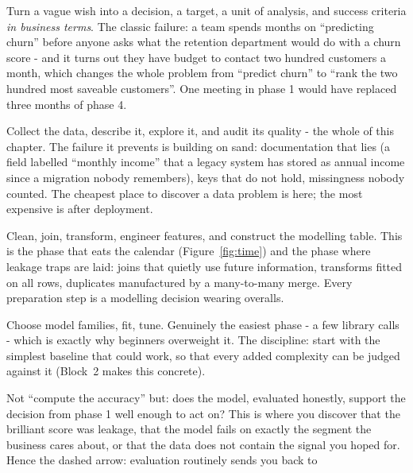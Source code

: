 \documentclass[11pt,a4paper]{article}
\begin{document}
\begin{description}[leftmargin=1.4em,style=nextline,itemsep=3pt]
  \item[1. Business understanding.] Turn a vague wish into a decision, a
        target, a unit of analysis, and success criteria \emph{in business
        terms}. The classic failure: a team spends months on ``predicting
        churn'' before anyone asks what the retention department would do
        with a churn score - and it turns out they have budget to contact
        two hundred customers a month, which changes the whole problem from
        ``predict churn'' to ``rank the two hundred most saveable
        customers''. One meeting in phase 1 would have replaced three
        months of phase 4.
  \item[2. Data understanding.] Collect the data, describe it, explore it,
        and audit its quality - the whole of this chapter. The failure it
        prevents is building on sand: documentation that lies (a field
        labelled ``monthly income'' that a legacy system has stored as
        annual income since a migration nobody remembers), keys that do not
        hold, missingness nobody counted. The cheapest place to discover a
        data problem is here; the most expensive is after deployment.
  \item[3. Data preparation.] Clean, join, transform, engineer features,
        and construct the modelling table. This is the phase that eats the
        calendar (Figure~\ref{fig:time}) and the phase where leakage traps
        are laid: joins that quietly use future information, transforms
        fitted on all rows, duplicates manufactured by a many-to-many merge.
        Every preparation step is a modelling decision wearing overalls.
  \item[4. Modelling.] Choose model families, fit, tune. Genuinely the
        easiest phase - a few library calls - which is exactly why
        beginners overweight it. The discipline: start with the simplest
        baseline that could work, so that every added complexity can be
        judged against it (Block~2 makes this concrete).
  \item[5. Evaluation.] Not ``compute the accuracy'' but: does the model,
        evaluated honestly, support the decision from phase 1 well enough
        to act on? This is where you discover that the brilliant score was
        leakage, that the model fails on exactly the segment the business
        cares about, or that the data does not contain the signal you hoped
        for. Hence the dashed arrow: evaluation routinely sends you back to

\end{description}
\end{document}
